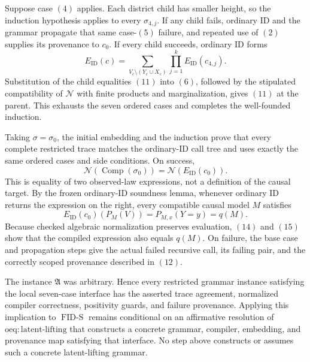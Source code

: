 Suppose case \((4)\) applies.  Each district child has smaller height, so the induction hypothesis applies to every \(\sigma_{4,j}\).  If any child fails, ordinary ID and the grammar propagate that same case-\((5)\) failure, and repeated use of \((2)\) supplies its provenance to \(c_0\).  If every child succeeds, ordinary ID forms
\[
 E_{\mathrm{ID}}(c)
 =\sum_{V_c\setminus(Y_c\cup X_c)}
   \prod_{j=1}^{k}E_{\mathrm{ID}}(c_{4,j}).
 \tag{13}
\]
Substitution of the child equalities \((11)\) into \((6)\), followed by the stipulated compatibility of \(\mathcal N\) with finite products and marginalization, gives \((11)\) at the parent.  This exhausts the seven ordered cases and completes the well-founded induction.

Taking \(\sigma=\sigma_0\), the initial embedding and the induction prove that every complete restricted trace matches the ordinary-ID call tree and uses exactly the same ordered cases and side conditions.  On success,
\[
 \mathcal N(\operatorname{Comp}(\sigma_0))
 =\mathcal N(E_{\mathrm{ID}}(c_0)).
 \tag{14}
\]
This is equality of two observed-law expressions, not a definition of the causal target.  By the frozen ordinary-ID soundness lemma, whenever ordinary ID returns the expression on the right, every compatible causal model \(M\) satisfies
\[
 E_{\mathrm{ID}}(c_0)(P_M(V))
 =P_{M,x}(Y=y)=q(M).
 \tag{15}
\]
Because checked algebraic normalization preserves evaluation, \((14)\) and \((15)\) show that the compiled expression also equals \(q(M)\).  On failure, the base case and propagation steps give the actual failed recursive call, its failing pair, and the correctly scoped provenance described in \((12)\).

The instance \(\mathfrak A\) was arbitrary.  Hence every restricted grammar instance satisfying the local seven-case interface has the asserted trace agreement, normalized compiler correctness, positivity guards, and failure provenance.  Applying this implication to \(\operatorname{FID\text{-}S}\) remains conditional on an affirmative resolution of \(\mathrm{oeq:latent\text{-}lifting}\) that constructs a concrete grammar, compiler, embedding, and provenance map satisfying that interface.  No step above constructs or assumes such a concrete latent-lifting grammar.
